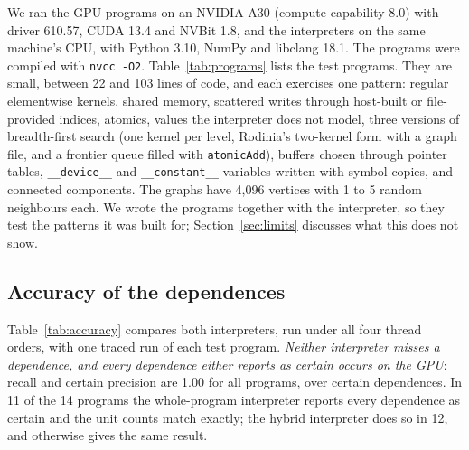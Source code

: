 \documentclass[11pt]{article}
\newcommand{\secref}[1]{Section~\ref{#1}}
\newcommand{\tabref}[1]{Table~\ref{#1}}
\newcommand{\code}[1]{\texttt{#1}}
\begin{document}
We ran the GPU programs on an NVIDIA A30 (compute capability 8.0) with driver 610.57, CUDA 13.4 and NVBit 1.8,
and the interpreters on the same machine's CPU, with Python 3.10, NumPy and libclang 18.1. The programs were compiled
with \code{nvcc -O2}. \tabref{tab:programs} lists the \numPrograms{} test programs. They are small, between 22 and
103 lines of code, and each exercises one pattern: regular elementwise kernels, shared memory, scattered writes
through host-built or file-provided indices, atomics, values the interpreter does not model, three versions of
breadth-first search (one kernel per level, Rodinia's two-kernel form with a graph file, and a frontier queue
filled with \code{atomicAdd}), buffers chosen through pointer tables, \code{\_\_device\_\_} and
\code{\_\_constant\_\_} variables written with symbol copies, and connected components. The graphs have
4{,}096 vertices with 1 to 5 random neighbours each. We wrote the programs together with the interpreter, so they
test the patterns it was built for; \secref{sec:limits} discusses what this does not show.

\begin{table}[tbp]
\centering
\footnotesize
\setlength{\tabcolsep}{4pt}

\caption{The test programs. Lines counts non-empty, non-comment lines. Operations is the number of kernel launches,
copies and fills the program issues, and dependences the number of dependences on the GPU.}
\label{tab:programs}
\end{table}

\subsection{Accuracy of the dependences}
\label{sec:eval-acc}

\tabref{tab:accuracy} compares both interpreters, run under all four thread orders, with one traced run of each
test program. \textit{Neither interpreter misses a dependence, and every dependence either reports as certain occurs
on the GPU}: recall and certain precision are 1.00 for all \numPrograms{} programs, over \numMustTotal{} certain
dependences. In 11 of the 14 programs the whole-program interpreter reports every dependence as certain and the
unit counts match exactly; the hybrid interpreter does so in 12, and otherwise gives the same result.
\end{document}

